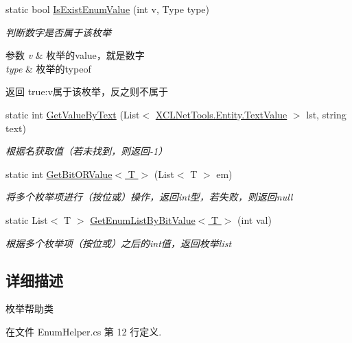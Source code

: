 \begin{DoxyCompactItemize}
static bool \hyperlink{class_x_c_l_net_tools_1_1_enum_1_1_enum_helper_a364b52512aee90c0f2530745f4127047}{Is\-Exist\-Enum\-Value} (int v, Type type)
\begin{DoxyCompactList}\small\item\em 判断数字是否属于该枚举 
\begin{DoxyParams}{参数}
{\em v} & 枚举的value，就是数字\\
\hline
{\em type} & 枚举的typeof\\
\hline
\end{DoxyParams}
\begin{DoxyReturn}{返回}
true\-:v属于该枚举，反之则不属于
\end{DoxyReturn}
\end{DoxyCompactList}\item 
static int \hyperlink{class_x_c_l_net_tools_1_1_enum_1_1_enum_helper_ab5d340064717d8cf3c9c6036d3770b1f}{Get\-Value\-By\-Text} (List$<$ \hyperlink{class_x_c_l_net_tools_1_1_entity_1_1_text_value}{X\-C\-L\-Net\-Tools.\-Entity.\-Text\-Value} $>$ lst, string text)
\begin{DoxyCompactList}\small\item\em 根据名获取值（若未找到，则返回-\/1） \end{DoxyCompactList}\item 
static int \hyperlink{class_x_c_l_net_tools_1_1_enum_1_1_enum_helper_a8ee641787655d2b4f06cb51486ea8be3}{Get\-Bit\-O\-R\-Value$<$ T $>$} (List$<$ T $>$ em)
\begin{DoxyCompactList}\small\item\em 将多个枚举项进行（按位或）操作，返回int型，若失败，则返回null \end{DoxyCompactList}\item 
static List$<$ T $>$ \hyperlink{class_x_c_l_net_tools_1_1_enum_1_1_enum_helper_a7023c3a9e2c46de0cdeed71bce2cfb6a}{Get\-Enum\-List\-By\-Bit\-Value$<$ T $>$} (int val)
\begin{DoxyCompactList}\small\item\em 根据多个枚举项（按位或）之后的int值，返回枚举list \end{DoxyCompactList}\end{DoxyCompactItemize}


\subsection{详细描述}
枚举帮助类 



在文件 Enum\-Helper.\-cs 第 12 行定义.



